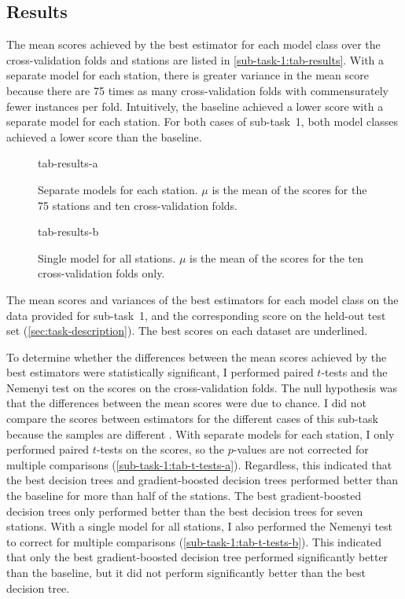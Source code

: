 \subsection{Results}
\label{sec:sub-task-1:results}

The mean scores achieved by the best estimator for each model class over the
cross-validation folds and stations are listed in \cref{sub-task-1:tab-results}.
With a separate model for each station, there is greater variance in the mean score
because there are 75 times as many cross-validation folds with commensurately fewer
instances per fold.
Intuitively, the baseline achieved a lower score with a separate model for each
station.
For both cases of sub-task~1, both model classes achieved a lower score than the
baseline.

\begin{table}
  \centering
  \begin{subfigure}{\textwidth}
    \centering
    {tab-results-a}
    \caption{Separate models for each station. $\mu$ is the mean of the scores for the
      75 stations and ten cross-validation folds.}
    \label{sub-task-1:tab-results-a}
  \end{subfigure}
  \subfigurespace
  \begin{subfigure}{\textwidth}
    \centering
    {tab-results-b}
    \caption{Single model for all stations. $\mu$ is the mean of the scores for the ten
      cross-validation folds only.}
    \label{sub-task-1:tab-results-b}
  \end{subfigure}
  \caption{The mean scores and variances of the best estimators for each model class on
    the data provided for sub-task~1, and the corresponding score on the held-out test
    set (\cref{sec:task-description}).
    The best scores on each dataset are underlined.
  }
  \label{sub-task-1:tab-results}
\end{table}

To determine whether the differences between the mean scores achieved by the best
estimators were statistically significant, I performed paired $t$-tests and the Nemenyi
test on the scores on the cross-validation folds.
The null hypothesis was that the differences between the mean scores were due to
chance.
I did not compare the scores between estimators for the different cases of this
sub-task because the samples are different \parencite[354]{Flach2012}.
With separate models for each station, I only performed paired $t$-tests on the scores,
so the $p$-values are not corrected for multiple comparisons
(\cref{sub-task-1:tab-t-tests-a}).
Regardless, this indicated that the best decision trees and gradient-boosted decision
trees performed better than the baseline for more than half of the stations.
The best gradient-boosted decision trees only performed better than the best decision
trees for seven stations.
With a single model for all stations, I also performed the Nemenyi test to correct for
multiple comparisons (\cref{sub-task-1:tab-t-tests-b}).
This indicated that only the best gradient-boosted decision tree performed
significantly better than the baseline, but it did not perform significantly better
than the best decision tree.

